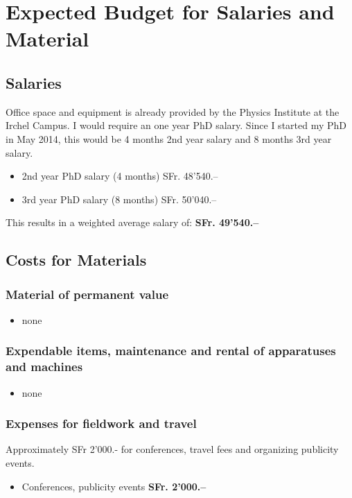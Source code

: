 \documentclass[12pt]{article}
\begin{document}
\pagestyle{empty}

\newpage

\section*{Expected Budget for Salaries and Material}

\subsection{Salaries}
Office space and equipment is already provided by the Physics Institute at the Irchel Campus.
I would require an one year PhD salary. Since I started my PhD in May 2014, this would be 4 months 2nd year salary and 8 months 3rd year salary.

\begin{itemize}
	\item 2nd year PhD salary (4 months) \hfill SFr. 48'540.--
	\item 3rd year PhD salary (8 months) \hfill SFr. 50'040.--
\end{itemize}

This results in a weighted average salary of: \hfill {\bf SFr. 49'540.--}


\subsection{Costs for Materials}

\subsubsection{Material of permanent value}

\begin{itemize}
	\item none
\end{itemize}


\subsubsection{Expendable items, maintenance and rental of apparatuses and machines}

\begin{itemize}
	\item none
\end{itemize}


\subsubsection{Expenses for fieldwork and travel}
Approximately SFr 2'000.- for conferences, travel fees and organizing publicity events.
\begin{itemize}
	\item Conferences, publicity events \hfill {\bf SFr. 2'000.--}
\end{itemize}
\end{document}
